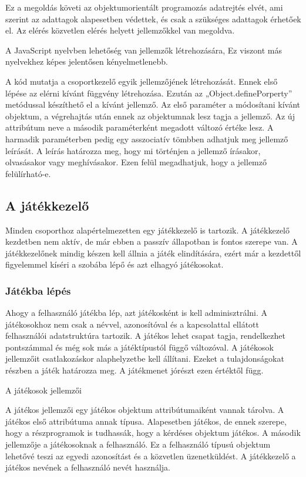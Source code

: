 \documentclass[bibliography=totocnumbered]{article}
\begin{document}
Ez a megoldás követi az objektumorientált programozás adatrejtés elvét,
ami szerint az adattagok alapesetben védettek, és csak a szükséges
adattagok érhetőek el. Az elérés közvetlen elérés helyett jellemzőkkel
van megoldva.

A JavaScript nyelvben lehetőség van jellemzők létrehozására, Ez viszont
más nyelvekhez képes jelentősen kényelmetlenebb.

A kód mutatja a csoportkezelő egyik jellemzőjének létrehozását.
Ennek első lépése az elérni kívánt függvény létrehozása. Ezután az
„Object.definePorperty'' metódussal készíthető el a kívánt jellemző. Az
első paraméter a módosítani kívánt objektum, a végrehajtás után ennek az
objektumnak lesz tagja a jellemző. Az új attribútum neve a második
paraméterként megadott változó értéke lesz. A harmadik paraméterben
pedig egy asszociatív tömbben adhatjuk meg jellemző leírását. A leírás
határozza meg, hogy mi történjen a jellemző írásakor, olvasásakor vagy
meghívásakor. Ezen felül megadhatjuk, hogy a jellemző felülírható-e.


\subsection{A játékkezelő}

Minden csoporthoz alapértelmezetten egy játékkezelő is tartozik. A
játékkezelő kezdetben nem aktív, de már ebben a passzív állapotban is
fontos szerepe van. A játékkezelőnek mindig készen kell állnia a játék
elindítására, ezért már a kezdettől figyelemmel kíséri a szobába lépő és
azt elhagyó játékosokat.


\subsubsection{Játékba lépés}

Ahogy a felhasználó játékba lép, azt játékosként is kell adminisztrálni.
A játékosokhoz nem csak a névvel, azonosítóval és a kapcsolattal
ellátott felhasználói adatstruktúra tartozik. A játékos lehet csapat
tagja, rendelkezhet pontszámmal és még sok más a játéktípustól függő
változóval. A játékosok jellemzőit csatlakozáskor alaphelyzetbe kell
állítani. Ezeket a tulajdonságokat részben a játék határozza meg. A
játékmenet jórészt ezen értéktől függ.

A játékosok jellemzői

A játékos jellemzői egy játékos objektum attribútumaiként vannak
tárolva. A játékos első attribútuma annak típusa. Alapesetben játékos,
de ennek szerepe, hogy a részprogramok is tudhassák, hogy a kérdéses
objektum játékos. A második jellemzője a játékosoknak a felhasználó. Ez
a felhasználó típusú objektum lehetővé teszi az egyedi azonosítást és a
közvetlen üzenetküldést. A játékkezelő a játékos nevének a felhasználó
nevét használja.
\end{document}
